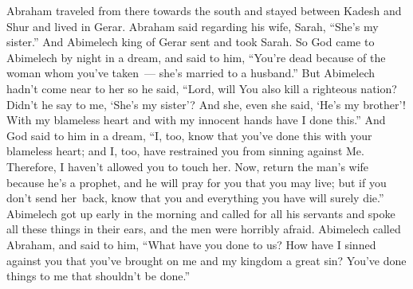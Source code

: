 
\begin{inparaenum}
   Abraham traveled from there towards the south and stayed between Kadesh and Shur and lived in Gerar.%
   Abraham said regarding his wife, Sarah, ``She's my sister.'' And Abimelech king of Gerar sent and took Sarah.%
   So God came to Abimelech by night in a dream, and said to him, ``You're dead because of the woman whom you've taken~--- she's married to a husband.''%
   But Abimelech hadn't come near to her so he said, ``Lord, will You also kill a righteous nation?%
   Didn't he say to me, `She's my sister'? And she, even she said, `He's my brother'! With my blameless heart and with my innocent hands have I done this.''%
   And God said to him in a dream, ``I, too, know that you've done this with your blameless heart; and I, too, have restrained you from sinning against Me. Therefore, I haven't allowed you to touch her.%
   Now, return the man's wife because he's a prophet, and he will pray for you that you may live; but if you don't send her\understood{}\ back, know that you and everything you have will surely die.''%
   Abimelech got up early in the morning and called for all his servants and spoke all these things in their ears, and the men were horribly afraid.%
   Abimelech called Abraham, and said to him, ``What have you done to us? How have I sinned against you that you've brought on me and my kingdom a great sin? You've done things to me that shouldn't be done.''%

\end{inparaenum}
